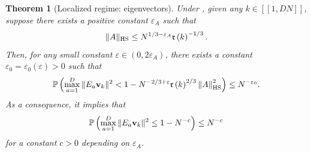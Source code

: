 \documentclass[10pt,reqno]{amsart}
\numberwithin{equation}{section}
\numberwithin{figure}{section}
\theoremstyle{plain} %
\newtheorem{theorem}{Theorem}[section]
\theoremstyle{definition} %
\renewcommand{\txt}[1]{\text{\rm{#1}}}
\newcommand{\fr}{{\mathfrak{r}}}
\newcommand{\qq}[1]{[\![{#1}]\!]}
\newcommand{\pa}[1]{\left({#1}\right)}
\newcommand{\norma}[1]{\left\lVert #1 \right\rVert}
\newcommand{\e}{{\varepsilon}}
\newcommand{\HS}{\txt{HS}}
\numberwithin{equation}{section}
\begin{document}
\begin{theorem}[Localized regime: eigenvectors]\label{theorem_localized_eigenvector_localization}
Under , given any $k\in\qq{1,DN}$, suppose there exists a positive constant $\varepsilon_A$ such that
\begin{equation}\label{eq:condA2}
\|A\|_{\HS}\le N^{1/3-\varepsilon_A}\fr\pa{k}^{-1/3} . 
\end{equation}
Then, for any small constant $\varepsilon\in(0,2\e_A)$, there exists a constant $\varepsilon_0=\varepsilon_0\pa{\varepsilon}>0$ such that
\begin{equation}\nonumber
    \begin{aligned}
        \mathbb P\left(\max_{a=1}^D \|E_a{\bf v}_k\|^2 < 1 - N^{-2/3+\varepsilon}\fr\pa{k}^{2/3}\norma{A}_{\HS}^2\right)\le N^{-\varepsilon_0}.
    \end{aligned}
\end{equation}
As a consequence, it implies that %
\begin{equation}\label{eq:main_evector2}
\mathbb P\left(\max_{a=1}^D \|E_a{\bf v}_k\|^2 \le 1 - N^{-c}\right)\le N^{-c}
\end{equation}
for a constant $c>0$ depending on $\e_A$.
\end{theorem}
\end{document}
